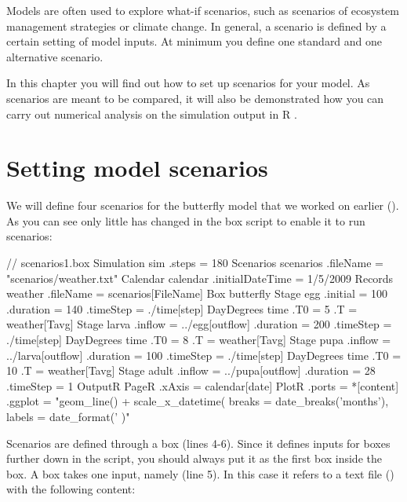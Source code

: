 Models are often used to explore what-if scenarios, such as scenarios of ecosystem management strategies or climate change. In general, a scenario is defined by a certain setting of model inputs. At minimum you define one standard and one alternative scenario.

In this chapter you will find out how to set up scenarios for your model. As scenarios are meant to be compared, it will also be demonstrated how you can carry out numerical analysis on the simulation output in R .

\section{Setting model scenarios}

We will define four scenarios for the butterfly model that we worked on earlier (). As you can see only little has changed in the box script to enable it to run scenarios:

\lstset{numbers=left}
\begin{boxscript}
// scenarios1.box
Simulation sim {
  .steps = 180
  Scenarios scenarios {
    .fileName = "scenarios/weather.txt"
  }
  Calendar calendar {
    .initialDateTime = 1/5/2009
  }
  Records weather {
    .fileName = scenarios[FileName]
  }
  Box butterfly {
    Stage egg {
      .initial = 100 
      .duration = 140
      .timeStep = ./time[step]
      DayDegrees time {
        .T0 = 5
        .T = weather[Tavg]
      }
    }
    Stage larva {
      .inflow = ../egg[outflow]
      .duration = 200
      .timeStep = ./time[step]
      DayDegrees time {
        .T0 = 8
        .T = weather[Tavg]
      }
    }
    Stage pupa {
      .inflow = ../larva[outflow]
      .duration = 100
      .timeStep = ./time[step]
      DayDegrees time {
        .T0 = 10
        .T = weather[Tavg]
      }
    }
    Stage adult {
      .inflow = ../pupa[outflow]
      .duration = 28
      .timeStep = 1
    }
  }
  OutputR {
    PageR {
      .xAxis = calendar[date]
      PlotR {
        .ports = *[content]
        .ggplot = "geom_line() + 
                   scale_x_datetime(
                     breaks = date_breaks('months'),
                     labels = date_format('%
                   )"      
      }
    }
  }
}
\end{boxscript}
\lstset{numbers=none}

Scenarios are defined through a  box (lines 4-6). Since it defines inputs for boxes further down in the script, you should always put it as the first box inside the  box. A  box takes one input, namely  (line 5). In this case it refers to a text file () with the following content:

